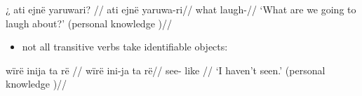 \documentclass{memoir}
\begin{document}
\ex \label{convrisamaj-12}
\begingl \glpreamble ¿ ati ejnë yaruwari? //
\gla ati ejnë yaruwa-ri//
\glb what  laugh-//
\glft ‘What are we going to laugh about?’ (personal knowledge
)//
\endgl
\xe

\begin{itemize}
\tightlist
\item
  not all transitive verbs take identifiable objects:
\end{itemize}

\ex \label{convrisamaj-44}
\begingl \glpreamble wïrë inija ta rë //
\gla wïrë ini-ja ta rë//
\glb {} see- like //
\glft ‘I haven’t seen.’ (personal knowledge
)//
\endgl
\xe

\printbibliography
\end{document}
